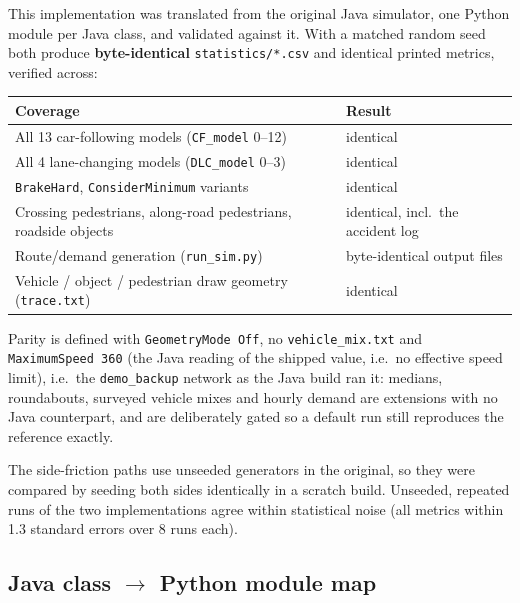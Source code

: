 \documentclass[11pt, a4paper]{article}
\newcommand{\code}[1]{\texttt{#1}}
\begin{document}
This implementation was translated from the original Java simulator, one Python
module per Java class, and validated against it. With a matched random seed both
produce \textbf{byte-identical} \code{statistics/*.csv} and identical printed
metrics, verified across:

\begin{center}
\begin{tabularx}{\textwidth}{X l}
\toprule
\textbf{Coverage} & \textbf{Result} \\
\midrule
All 13 car-following models (\code{CF\_model} 0--12) & identical \\
All 4 lane-changing models (\code{DLC\_model} 0--3) & identical \\
\code{BrakeHard}, \code{ConsiderMinimum} variants & identical \\
Crossing pedestrians, along-road pedestrians, roadside objects & identical, incl.\ the accident log \\
Route/demand generation (\code{run\_sim.py}) & byte-identical output files \\
Vehicle / object / pedestrian draw geometry (\code{trace.txt}) & identical \\
\bottomrule
\end{tabularx}
\end{center}

Parity is defined with \code{GeometryMode Off}, no \code{vehicle\_mix.txt} and
\code{MaximumSpeed 360} (the Java reading of the shipped value, i.e.\ no
effective speed limit), i.e.\ the \code{demo\_backup} network as the Java build
ran it: medians, roundabouts, surveyed vehicle
mixes and hourly demand are extensions with no Java counterpart, and are
deliberately gated so a default run still reproduces the reference exactly.

The side-friction paths use unseeded generators in the original, so they were
compared by seeding both sides identically in a scratch build. Unseeded, repeated
runs of the two implementations agree within statistical noise (all metrics
within 1.3 standard errors over 8 runs each).

\subsection{Java class $\rightarrow$ Python module map}
\end{document}
